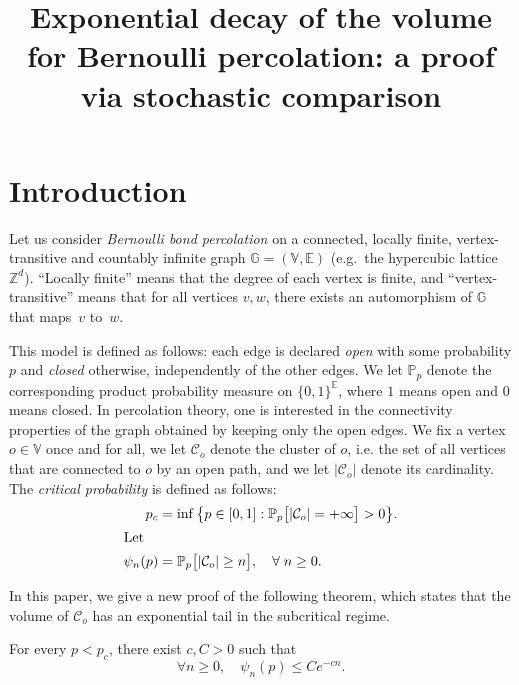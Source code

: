 \documentclass[AHL,Unicode,longabstracts,published]{cedram}
\title[Exponential decay of the volume for Bernoulli percolation]{Exponential decay of the volume for Bernoulli percolation: a proof via stochastic comparison}
\author[\initial{H.} \lastname{Vanneuville}]{\firstname{Hugo} \lastname{Vanneuville}}
\newcommand{\E}{\mathbb{E}}
\newcommand{\G}{\mathbb{G}}
\newcommand{\V}{\mathbb{V}}
\newcommand{\Z}{\mathbb{Z}}
\newcommand{\Pro}{\mathbb{P}}
\newcommand{\calC}{\mathcal{C}}
\let\oldforall\forall
\renewcommand*{\forall}{\mathrel{\oldforall}}
\begin{document}
\maketitle

\section{Introduction}

Let us consider \emph{Bernoulli bond percolation} on a connected, locally finite, vertex-transitive and countably infinite graph $\G=(\V,\E)$ (e.g.\ the hypercubic lattice $\Z^d$). ``Locally finite'' means that the degree of each vertex is finite, and ``vertex-transitive'' means that for all vertices $v,w$, there exists an automorphism of $\G$ that maps~$v$ to~$w$.


This model is defined as follows: each edge is declared \emph{open} with some probability $p$ and \emph{closed} otherwise, independently of the other edges. We let $\Pro_p$ denote the corresponding product probability measure on $\{0,1\}^{\E}$, where $1$ means open and $0$ means closed. In percolation theory, one is interested in the connectivity properties of the graph obtained by keeping only the open edges. We fix a vertex $o \in \V$ once and for all, we let $\calC_o$ denote the cluster of $o$, i.e. the set of all vertices that are connected to $o$ by an open path, and we let $|\calC_o|$ denote its cardinality. The \emph{critical probability} is defined as follows:
\begin{align*}
p_c &= \inf \big\{ p \in [0,1] : \Pro_p\big[|\calC_o|=+\infty\big]>0 \big\}.
\\
\intertext{Let}
\psi_n(p) &= \Pro_p\big[|\calC_o| \ge n\big], \quad \forall n \ge 0.
\end{align*}

In this paper, we give a new proof of the following theorem, which states that the volume of $\calC_o$ has an exponential tail in the subcritical regime.

\begin{theo}\label{thm:exp'}
For every $p<p_c$, there exist $c,C>0$ such that
\[
\forall n \ge 0, \quad \psi_n(p) \le Ce^{-cn}.
\]
\end{theo}
\end{document}
